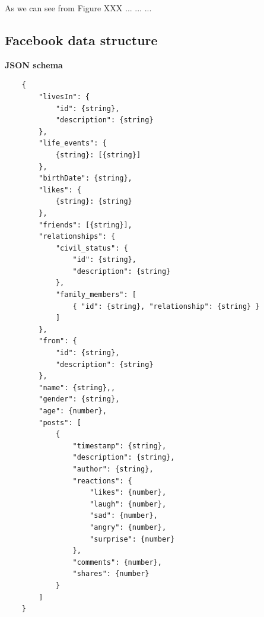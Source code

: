 As we can see from Figure XXX ... ... ...








\clearpage

\subsection*{Facebook data structure}
\textbf{JSON schema}
\begin{verbatim}
    {
        "livesIn": {
            "id": {string},
            "description": {string}
        },
        "life_events": {
            {string}: [{string}]
        },
        "birthDate": {string},
        "likes": {
            {string}: {string}
        },
        "friends": [{string}],
        "relationships": {
            "civil_status": {
                "id": {string},
                "description": {string}
            },
            "family_members": [
                { "id": {string}, "relationship": {string} }
            ]
        },
        "from": {
            "id": {string},
            "description": {string}
        },
        "name": {string},,
        "gender": {string},
        "age": {number},
        "posts": [
            {
                "timestamp": {string},
                "description": {string},
                "author": {string},
                "reactions": {
                    "likes": {number},
                    "laugh": {number},
                    "sad": {number},
                    "angry": {number},
                    "surprise": {number}
                },
                "comments": {number},
                "shares": {number}
            }
        ]
    }
\end{verbatim}

